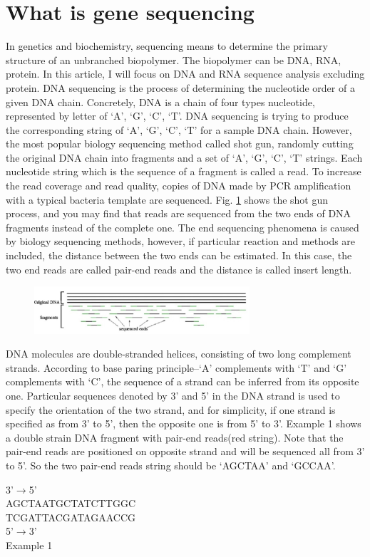 \documentclass{article}
\begin{document}
\section{What is gene sequencing}
In genetics and biochemistry, sequencing means to determine the primary structure of an unbranched biopolymer. The biopolymer can be DNA, RNA, protein. In this article, I will focus on DNA and RNA sequence analysis excluding protein. DNA sequencing is the process of determining the nucleotide order of a given DNA chain. Concretely, DNA is a chain of four types nucleotide, represented by letter of `A', `G', `C', `T'. DNA sequencing is trying to produce the corresponding string of `A', `G', `C', `T' for a sample DNA chain. However, the most popular biology sequencing method called shot gun, randomly cutting the original DNA chain into fragments and a set of `A', `G', `C', `T' strings. Each nucleotide string which is the sequence of a fragment is called a read. To increase the read coverage and read quality, copies of DNA made by PCR amplification with a typical bacteria template are sequenced. Fig. \ref{shot_gun_method} shows the shot gun process, and you may find that reads are sequenced from the two ends of DNA fragments instead of the complete one. The end sequencing phenomena is caused by biology sequencing methods, however, if particular reaction and methods are included, the distance between the two ends can be estimated. In this case, the two end reads are called pair-end reads and the distance is called insert length.\\
\begin{figure}[ht]
  \centering
  \includegraphics[width=8cm]{Figure1.jpg}\\
  \caption{}\label{shot_gun_method}
\end{figure}
DNA molecules are double-stranded helices, consisting of two long complement strands. According to base paring principle--`A' complements with `T' and `G' complements with `C', the sequence of a strand can be inferred from its opposite one. Particular sequences denoted by 3' and 5' in the DNA strand is used to specify the orientation of the two strand, and for simplicity, if one strand is specified as from 3' to 5', then the opposite one is from 5' to 3'. Example 1 shows a double strain DNA fragment with pair-end reads(red string). Note that the pair-end reads are positioned on opposite strand and will be sequenced all from 3' to 5'. So the two pair-end reads string should be `AGCTAA' and `GCCAA'.
\begin{center}
  3'$\rightarrow$5'\\
  {\color{red}AGCTAA}TGCTATCTTGGC\\
  TCGATTACGATAG{\color{red}AACCG}\\
  5'$\rightarrow$3'\\
  Example 1\\
\end{center}
\end{document}
